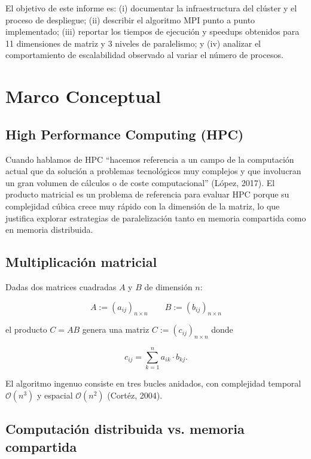 \documentclass{article}
\begin{document}
El objetivo de este informe es: (i) documentar la infraestructura del clúster y el proceso de despliegue; (ii) describir el algoritmo MPI punto a punto implementado; (iii) reportar los tiempos de ejecución y speedups obtenidos para 11 dimensiones de matriz y 3 niveles de paralelismo; y (iv) analizar el comportamiento de escalabilidad observado al variar el número de procesos.

\section{Marco Conceptual}

\subsection{High Performance Computing (HPC)}

Cuando hablamos de HPC ``hacemos referencia a un campo de la computación actual que da solución a problemas tecnológicos muy complejos y que involucran un gran volumen de cálculos o de coste computacional'' (López, 2017)\cite{lopez}. El producto matricial es un problema de referencia para evaluar HPC porque su complejidad cúbica crece muy rápido con la dimensión de la matriz, lo que justifica explorar estrategias de paralelización tanto en memoria compartida como en memoria distribuida.

\subsection{Multiplicación matricial}

Dadas dos matrices cuadradas $A$ y $B$ de dimensión $n$:

\[ A := (a_{ij})_{n \times n} \qquad B := (b_{ij})_{n \times n} \]

el producto $C = AB$ genera una matriz $C := (c_{ij})_{n \times n}$ donde

\[ c_{ij} = \sum_{k=1}^{n} a_{ik} \cdot b_{kj}. \]

El algoritmo ingenuo consiste en tres bucles anidados, con complejidad temporal $\mathcal{O}(n^3)$ y espacial $\mathcal{O}(n^2)$ (Cortéz, 2004)\cite{cortez}.

\subsection{Computación distribuida vs. memoria compartida}
\end{document}
